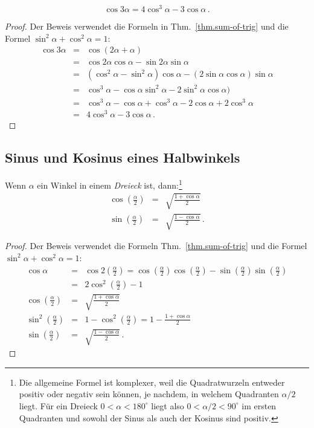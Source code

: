 \begin{theorem}\label{thm.triple-angle}
\[
\cos 3\alpha=4\cos^3\alpha -3\cos\alpha\,.
\]
\end{theorem}
\begin{proof}
Der Beweis verwendet die Formeln in Thm.~\ref{thm.sum-of-trig} und die Formel $\sin^2\alpha+\cos^2\alpha=1$:
\begin{eqnarray*}
\cos 3\alpha &=& \cos (2\alpha +\alpha)\\
&=& \cos 2\alpha\cos\alpha - \sin 2\alpha\sin\alpha\\
&=& (\cos^2\alpha -\sin^2\alpha)\cos\alpha - (2\sin\alpha\cos\alpha)\sin\alpha\\
&=&\cos^3\alpha - \cos\alpha\sin^2\alpha -2\sin^2\alpha\cos\alpha)\\
&=&\cos^3\alpha - \cos\alpha +\cos^3\alpha -2\cos\alpha+2\cos^3\alpha\\
&=&4\cos^3\alpha -3\cos\alpha\,.
\end{eqnarray*}
\end{proof}


\subsection{Sinus und Kosinus eines Halbwinkels}\label{s.sine-cosine-half}

\begin{theorem}\label{thm.sine-cosine-half}
Wenn $\alpha$ ein Winkel in einem \emph{Dreieck} ist, dann:\footnote{Die allgemeine Formel ist komplexer, weil die Quadratwurzeln entweder positiv oder negativ sein können, je nachdem, in welchem Quadranten $\alpha/2$ liegt. Für ein Dreieck $0\!<\!\alpha\!<\!180^\circ$ liegt also $0\!<\!\alpha/2\!<\!90^\circ$ im ersten Quadranten und sowohl der Sinus als auch der Kosinus sind positiv.}
\begin{eqnarray*}
\cos \left(\frac{\alpha}{2}\right)&=&\sqrt{\frac{1+\cos\alpha}{2}}\\
\sin\left(\frac{\alpha}{2}\right)&=&\sqrt{\frac{1-\cos\alpha}{2}}\,.
\end{eqnarray*}
\end{theorem}

\begin{proof}
Der Beweis verwendet die Formeln Thm.~\ref{thm.sum-of-trig} und die Formel $\sin^2\alpha+\cos^2\alpha=1$:
\begin{eqnarray*}
\cos \alpha&=&\cos 2\left(\frac{\alpha}{2}\right)=\cos \left(\frac{\alpha}{2}\right)\cos\left(\frac{\alpha}{2}\right)-\sin \left(\frac{\alpha}{2}\right)\sin\left(\frac{\alpha}{2}\right)\\
&=&2\cos^2 \left(\frac{\alpha}{2}\right)-1\\
\cos \left(\frac{\alpha}{2}\right)&=&\sqrt{\frac{1+\cos\alpha}{2}}\\
\sin^2\left(\frac{\alpha}{2}\right)&=& 1-\cos^2\left(\frac{\alpha}{2}\right)=1-\frac{1+\cos\alpha}{2}\\
\sin \left(\frac{\alpha}{2}\right)&=&\sqrt{\frac{1-\cos\alpha}{2}}\,.
\end{eqnarray*}
\end{proof}

